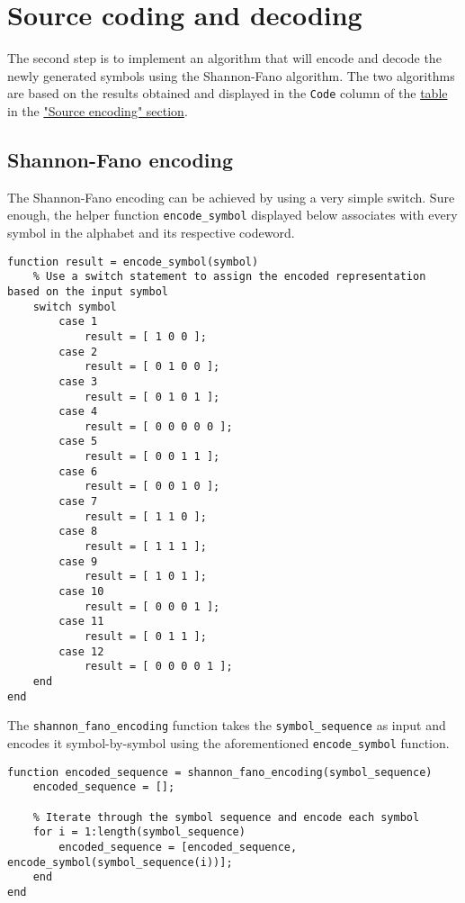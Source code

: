 \vspace{40px} \section{Source coding and decoding}
The second step is to implement an algorithm that will encode and decode the newly generated symbols using the Shannon-Fano algorithm. The two algorithms are based on the results obtained and displayed in the \texttt{Code} column of the \hyperref[tab:shannon-fano]{table} in the \hyperref[source-encoding]{"Source encoding" section}.

\subsection{Shannon-Fano encoding}
The Shannon-Fano encoding can be achieved by using a very simple switch. Sure enough, the helper function \texttt{encode\_symbol} displayed below associates with every symbol in the alphabet and its respective codeword.

\begin{lstlisting}
function result = encode_symbol(symbol)
    % Use a switch statement to assign the encoded representation based on the input symbol
    switch symbol
        case 1
            result = [ 1 0 0 ];
        case 2
            result = [ 0 1 0 0 ];
        case 3 
            result = [ 0 1 0 1 ];
        case 4 
            result = [ 0 0 0 0 0 ];
        case 5 
            result = [ 0 0 1 1 ];
        case 6 
            result = [ 0 0 1 0 ];
        case 7 
            result = [ 1 1 0 ];
        case 8 
            result = [ 1 1 1 ];
        case 9 
            result = [ 1 0 1 ];
        case 10 
            result = [ 0 0 0 1 ];
        case 11 
            result = [ 0 1 1 ];
        case 12
            result = [ 0 0 0 0 1 ];
    end
end
\end{lstlisting}

\noindent The \texttt{shannon\_fano\_encoding} function takes the \texttt{symbol\_sequence} as input and encodes it symbol-by-symbol using the aforementioned \texttt{encode\_symbol} function.

\begin{lstlisting}
function encoded_sequence = shannon_fano_encoding(symbol_sequence)
    encoded_sequence = [];
    
    % Iterate through the symbol sequence and encode each symbol
    for i = 1:length(symbol_sequence)
        encoded_sequence = [encoded_sequence, encode_symbol(symbol_sequence(i))];
    end
end
\end{lstlisting}

